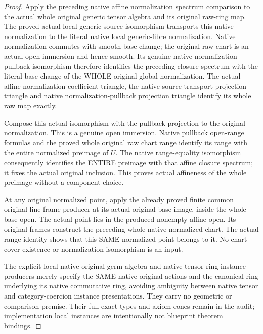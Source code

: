 \begin{proof}
Apply the preceding native affine normalization spectrum comparison to the
actual whole original generic tensor algebra and its original raw-ring map.
The proved actual local generic source isomorphism transports this native
normalization to the literal native local generic-fibre normalization.
Native normalization commutes with smooth base change; the original raw
chart is an actual open immersion and hence smooth. Its genuine native
normalization-pullback isomorphism therefore identifies the preceding closure
spectrum with the literal base change of the WHOLE original global
normalization. The actual affine normalization coefficient triangle, the
native source-transport projection triangle and native normalization-pullback
projection triangle identify its whole raw map exactly.

Compose this actual isomorphism with the pullback projection to the original
normalization. This is a genuine open immersion. Native pullback open-range
formulas and the proved whole original raw chart range identify its range
with the entire normalized preimage of $U$. The native range-equality
isomorphism consequently identifies the ENTIRE preimage with that affine
closure spectrum; it fixes the actual original inclusion. This proves actual
affineness of the whole preimage without a component choice.

At any original normalized point, apply the already proved finite common
original line-frame producer at its actual original base image, inside the
whole base open. The actual point lies in the produced nonempty affine open.
Its original frames construct the preceding whole native normalized chart.
The actual range identity shows that this SAME normalized point belongs to
it. No chart-cover existence or normalization isomorphism is an input.

The explicit local native original germ algebra and native tensor-ring
instance producers merely specify the SAME native original actions and the
canonical ring underlying its native commutative ring, avoiding ambiguity
between native tensor and category-coercion instance presentations. They
carry no geometric or comparison premise. Their full exact types and axiom
cones remain in the audit; implementation local instances are intentionally
not blueprint theorem bindings.
\end{proof}

